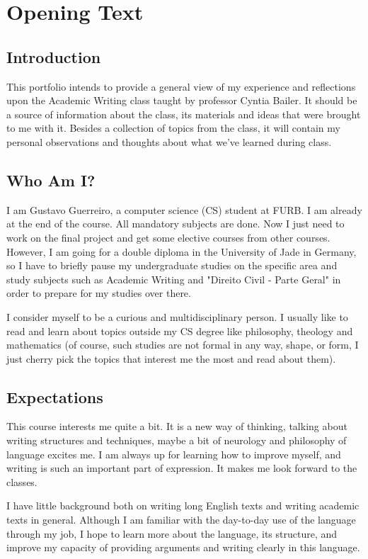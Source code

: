 \chapter{Opening Text}

\section*{Introduction}
This portfolio intends to provide a general view of my experience and reflections upon the Academic Writing class taught by professor Cyntia Bailer. It should be a source of information about the class, its materials and ideas that were brought to me with it. Besides a collection of topics from the class, it will contain my personal observations and thoughts about what we've learned during class.

\section*{Who Am I?}
I am Gustavo Guerreiro, a computer science (CS) student at FURB. I am already at the end of the course. All mandatory subjects are done. Now I just need to work on the final project and get some elective courses from other courses. However, I am going for a double diploma in the University of Jade in Germany, so I have to briefly pause my undergraduate studies on the specific area and study subjects such as Academic Writing and "Direito Civil - Parte Geral" in order to prepare for my studies over there.

I consider myself to be a curious and multidisciplinary person. I usually like to read and learn about topics outside my CS degree like philosophy, theology and mathematics (of course, such studies are not formal in any way, shape, or form, I just cherry pick the topics that interest me the most and read about them).

\section*{Expectations}
This course interests me quite a bit. It is a new way of thinking, talking about writing structures and techniques, maybe a bit of neurology and philosophy of language excites me. I am always up for learning how to improve myself, and writing is such an important part of expression. It makes me look forward to the classes.

I have little background both on writing long English texts and writing academic texts in general. Although I am familiar with the day-to-day use of the language through my job, I hope to learn more about the language, its structure, and improve my capacity of providing arguments and writing clearly in this language.
